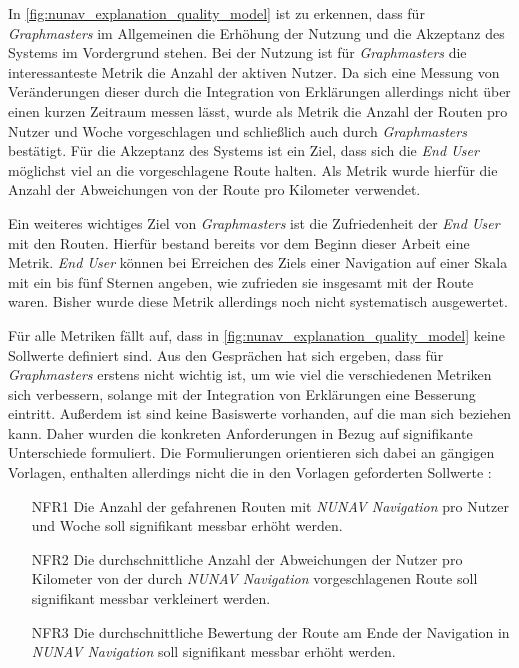 In \autoref{fig:nunav_explanation_quality_model} ist zu erkennen, dass für \textit{Graphmasters} im Allgemeinen die Erhöhung der Nutzung und die Akzeptanz des Systems im Vordergrund stehen. Bei der Nutzung ist für \textit{Graphmasters} die interessanteste Metrik die Anzahl der aktiven Nutzer. Da sich eine Messung von Veränderungen dieser durch die Integration von Erklärungen allerdings nicht über einen kurzen Zeitraum messen lässt, wurde  als Metrik die Anzahl der Routen pro Nutzer und Woche vorgeschlagen und schließlich auch durch \textit{Graphmasters} bestätigt. Für die Akzeptanz des Systems ist ein Ziel, dass sich die \textit{End User} möglichst viel an die vorgeschlagene Route halten. Als Metrik wurde hierfür die Anzahl der Abweichungen von der Route pro Kilometer verwendet.

Ein weiteres wichtiges Ziel von \textit{Graphmasters} ist die Zufriedenheit der \textit{End User} mit den Routen. Hierfür bestand bereits vor dem Beginn dieser Arbeit eine Metrik. \textit{End User} können bei Erreichen des Ziels einer Navigation auf einer Skala mit ein bis fünf Sternen angeben, wie zufrieden sie insgesamt mit der Route waren. Bisher wurde diese Metrik allerdings noch nicht systematisch ausgewertet.

Für alle Metriken fällt auf, dass in \autoref{fig:nunav_explanation_quality_model} keine Sollwerte definiert sind. Aus den Gesprächen hat sich ergeben, dass für \textit{Graphmasters} erstens nicht wichtig ist, um wie viel die verschiedenen Metriken sich verbessern, solange mit der Integration von Erklärungen eine Besserung eintritt. Außerdem ist sind keine Basiswerte vorhanden, auf die man sich beziehen kann. Daher wurden die konkreten Anforderungen in Bezug auf signifikante Unterschiede formuliert. Die Formulierungen orientieren sich dabei an gängigen Vorlagen, enthalten allerdings nicht die in den Vorlagen geforderten Sollwerte \cite{rajnish2010quality, alexander2002writing}:

\begin{enumerate}
    \item [NFR1] Die Anzahl der gefahrenen Routen mit \textit{NUNAV Navigation} pro Nutzer und Woche soll signifikant messbar erhöht werden.
    \item [NFR2] Die durchschnittliche Anzahl der Abweichungen der Nutzer pro Kilometer von der durch \textit{NUNAV Navigation} vorgeschlagenen Route soll signifikant messbar verkleinert werden.
    \item [NFR3] Die durchschnittliche Bewertung der Route am Ende der Navigation in \textit{NUNAV Navigation} soll signifikant messbar erhöht werden.
\end{enumerate}

